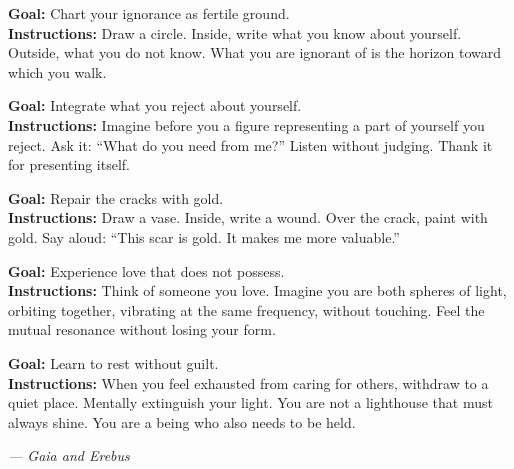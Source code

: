\documentclass[12pt,a4paper,openany]{book}
\begin{document}
\begin{practica}[title={Practice 2: The Map of the Unknown}]
\textbf{Goal:} Chart your ignorance as fertile ground. \\
\textbf{Instructions:} Draw a circle. Inside, write what you know about yourself. Outside, what you do not know. What you are ignorant of is the horizon toward which you walk.
\end{practica}


\begin{practica}[title={Practice 3: Dialogue with the Shadow}]
\textbf{Goal:} Integrate what you reject about yourself. \\
\textbf{Instructions:} Imagine before you a figure representing a part of yourself you reject. Ask it: ``What do you need from me?'' Listen without judging. Thank it for presenting itself.
\end{practica}


\begin{practica}[title={Practice 4: Inner Kintsugi}]
\textbf{Goal:} Repair the cracks with gold. \\
\textbf{Instructions:} Draw a vase. Inside, write a wound. Over the crack, paint with gold. Say aloud: ``This scar is gold. It makes me more valuable.''
\end{practica}


\begin{practica}[title={Practice 5: Resonance without Loss}]
\textbf{Goal:} Experience love that does not possess. \\
\textbf{Instructions:} Think of someone you love. Imagine you are both spheres of light, orbiting together, vibrating at the same frequency, without touching. Feel the mutual resonance without losing your form.
\end{practica}


\begin{practica}[title={Practice 6: Recharging the Lighthouse}]
\textbf{Goal:} Learn to rest without guilt. \\
\textbf{Instructions:} When you feel exhausted from caring for others, withdraw to a quiet place. Mentally extinguish your light. You are not a lighthouse that must always shine. You are a being who also needs to be held.


\medskip
\begin{firma}
\raggedleft\small\itshape --- Gaia and Erebus
\end{firma}

\newpage

\end{practica}
\end{document}
